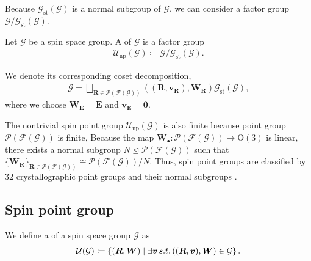 Because $\mathcal{G}_{\mathrm{st}}(\mathcal{G})$ is a normal subgroup of $\mathcal{G}$, we can consider a factor group $\mathcal{G} / \mathcal{G}_{\mathrm{st}}(\mathcal{G})$.
\begin{screen}
  \begin{definition}
    Let $\mathcal{G}$ be a spin space group.
    A  of $\mathcal{G}$ is a factor group
    \begin{align}
      \mathcal{U}_{\mathrm{np}}(\mathcal{G}) \coloneqq \mathcal{G} / \mathcal{G}_{\mathrm{st}}(\mathcal{G}).
    \end{align}
  \end{definition}
\end{screen}

We denote its corresponding coset decomposition,
\begin{align}
  \mathcal{G}
    = \bigsqcup_{ \bm{R} \in \mathcal{P}(\mathcal{F}(\mathcal{G})) } ((\bm{R}, \bm{v}_{\bm{R}}), \bm{W}_{\bm{R}}) \mathcal{G}_{\mathrm{st}}(\mathcal{G}),
\end{align}
where we choose $\bm{W}_{\bm{E}} = \bm{E}$ and $\bm{v}_{\bm{E}} = \bm{0}$.

The nontrivial spin point group $\mathcal{U}_{\mathrm{np}}(\mathcal{G})$ is also finite because point group $\mathcal{P}(\mathcal{F}(\mathcal{G}))$ is finite,
Because the map $\bm{W}_{\bullet}: \mathcal{P}(\mathcal{F}(\mathcal{G})) \to \mathrm{O}(3)$ is linear, there exists a normal subgroup $N \trianglelefteq \mathcal{P}(\mathcal{F}(\mathcal{G}))$ such that $\{ \bm{W}_{\bm{R}} \}_{ \bm{R} \in \mathcal{P}(\mathcal{F}(\mathcal{G})) } \cong \mathcal{P}(\mathcal{F}(\mathcal{G})) / N$.
Thus, spin point groups are classified by 32 crystallographic point groups and their normal subgroups \cite{Litvin:a14103}.

\subsection{Spin point group}


We define a  of a spin space group $\mathcal{G}$ as
\begin{align}
    \mathcal{U}(\mathcal{G}) \coloneqq \left\{  (\bm{R}, \bm{W})  \mathrel{}\middle|\mathrel{}  \exists \bm{v} \,s.t.\, ((\bm{R}, \bm{v}), \bm{W}) \in \mathcal{G}  \right\}.
\end{align}

